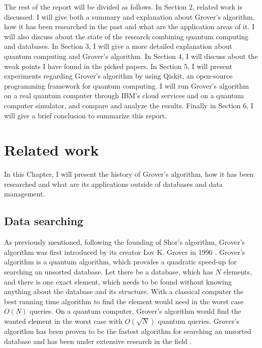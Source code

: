 \documentclass[english,oneside,openright]{UH_DS_report}
\begin{document}
The rest of the report will be divided as follows. In Section 2, related work is discussed. I will give both a summary and explanation about Grover's algorithm, how it has been researched in the past and what are the application areas of it. I will also discuss about the state of the research combining quantum computing and databases. In Section 3, I will give a more detailed explanation about quantum computing and Grover's algorithm. In Section 4, I will discuss about the weak points I have found in the picked papers. In Section 5, I will present experiments regarding Grover's algorithm by using Qiskit, an open-source programming framework for quantum computing. I will run Grover's algorithm on a real quantum computer through IBM's cloud services and on a quantum computer simulator, and compare and analyze the results. Finally in Section 6, I will give a brief conclusion to summarize this report.

\chapter{Related work}
\label{chapter:relatedwork}

In this Chapter, I will present the history of Grover's algorithm, how it has been researched and what are its applications outside of databases and data management.

\section{Data searching}

As previously mentioned, following the founding of Shor's algorithm, Grover's algorithm was first introduced by its creator Lov K. Grover in 1996 \cite{grover1996fast}. Grover's algorithm is a quantum algorithm, which provides a quadratic speed-up for searching an unsorted database. Let there be a database, which has $N$ elements, and there is one exact element, which needs to be found without knowing anything about the database and its structure. With a classical computer the best running time algorithm to find the element would need in the worst case $O(N)$ queries. On a quantum computer, Grover's algorithm would find the wanted element in the worst case with $O(\sqrt{N})$ quantum queries. Grover's algorithm has been proven to be the fastest algorithm for searching an unsorted database \cite{giri2017review, introtoqc} and has been under extensive research in the field \cite{giri2017review}.
\end{document}
